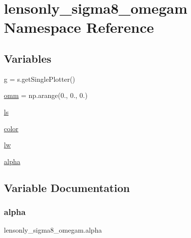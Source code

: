 \hypertarget{namespacelensonly__sigma8__omegam}{}\section{lensonly\+\_\+sigma8\+\_\+omegam Namespace Reference}
\label{namespacelensonly__sigma8__omegam}
\subsection*{Variables}
\begin{DoxyCompactItemize}
\item 
\mbox{\hyperlink{namespacelensonly__sigma8__omegam_afb174d084822ab22407b18f800505a64}{g}} = s.\+get\+Single\+Plotter()
\item 
\mbox{\hyperlink{namespacelensonly__sigma8__omegam_a90539d8dde1894a29e08d53e54039599}{omm}} = np.\+arange(0., 0., 0.)
\item 
\mbox{\hyperlink{namespacelensonly__sigma8__omegam_a65c358fcb730d2b14f9320192ea1d264}{ls}}
\item 
\mbox{\hyperlink{namespacelensonly__sigma8__omegam_ae3a5e5f90cba276e17825826acd825d7}{color}}
\item 
\mbox{\hyperlink{namespacelensonly__sigma8__omegam_ac33f212c7520c33c19b72a41a6ef142f}{lw}}
\item 
\mbox{\hyperlink{namespacelensonly__sigma8__omegam_a4ba6781a77a1039172df8ea0e0775fe7}{alpha}}
\end{DoxyCompactItemize}


\subsection{Variable Documentation}
\mbox{\label{namespacelensonly__sigma8__omegam_a4ba6781a77a1039172df8ea0e0775fe7}} 
\subsubsection{\texorpdfstring{alpha}{alpha}}
{\footnotesize\ttfamily lensonly\+\_\+sigma8\+\_\+omegam.\+alpha}

\mbox{\label{namespacelensonly__sigma8__omegam_ae3a5e5f90cba276e17825826acd825d7}} 
